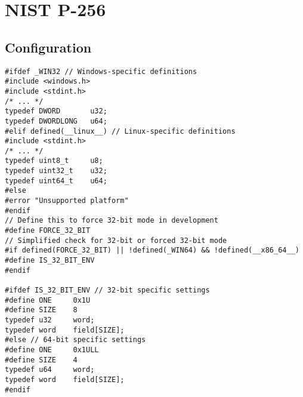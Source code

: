 \chapter{NIST P-256}
\iffalse
\section{Time Measure in Linux}

\begin{lstlisting}[style=C]
#define _POSIX_C_SOURCE 200809L
#include <time.h>

typedef int8_t i8;
typedef int32_t i32;
typedef int64_t i64;

typedef uint8_t u8;
typedef uint32_t u32;
typedef uint64_t u64;

inline u64 rdtsc(void) {
	u32 lo, hi;
	
	__asm__ __volatile__ (
	"rdtsc" : "=a" (lo), "=d" (hi)
	);
	
	return ((u64)hi << 32) | lo;
}

u64 measure_cycle(void (*func)(u8*, u8*), u8* para1, u8* para2) {
	u64 start, end;
	const u64 num_runs = 10000;
	
	func(para1, para2);
	start = rdtsc();
	for (i32 i = 0; i < num_runs; i++)
		func(para1, para2);
	end = rdtsc();
	
	return (end - start) / num_runs;
}

double measure_time(void (*func)(u8*, u8*), u8* para1, u8* para2) {
	struct timespec start, end;
	double cpu_time_used;
	const double num_runs = 10000;
	
	func(para1, para2);
	clock_gettime(CLOCK_MONOTONIC, &start);
	for (i32 i = 0; i < num_runs; i++)
		func(para1, para2);
	clock_gettime(CLOCK_MONOTONIC, &end);
	
	cpu_time_used =
		(end.tv_sec - start.tv_sec) +
		(end.tv_nsec - start.tv_nsec) / 1e9;
	
	return cpu_time_used / num_runs;
}
\end{lstlisting}
\fi

\section*{Configuration}
\begin{lstlisting}[style=C]
#ifdef _WIN32 // Windows-specific definitions
#include <windows.h>
#include <stdint.h>
/* ... */
typedef DWORD       u32;
typedef DWORDLONG   u64;
#elif defined(__linux__) // Linux-specific definitions
#include <stdint.h>
/* ... */
typedef uint8_t     u8;
typedef uint32_t    u32;
typedef uint64_t    u64;
#else
#error "Unsupported platform"
#endif
// Define this to force 32-bit mode in development
#define FORCE_32_BIT
// Simplified check for 32-bit or forced 32-bit mode
#if defined(FORCE_32_BIT) || !defined(_WIN64) && !defined(__x86_64__)
#define IS_32_BIT_ENV
#endif

#ifdef IS_32_BIT_ENV // 32-bit specific settings
#define ONE     0x1U
#define SIZE    8
typedef u32     word;
typedef word    field[SIZE];
#else // 64-bit specific settings
#define ONE     0x1ULL
#define SIZE    4
typedef u64     word;
typedef word    field[SIZE];
#endif
\end{lstlisting}

